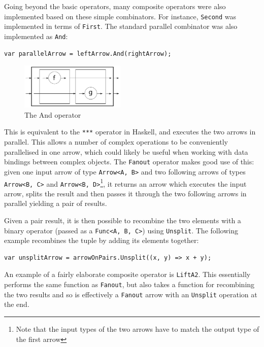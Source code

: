 \documentclass[12pt,twoside,notitlepage]{report}
\begin{document}
Going beyond the basic operators, many composite operators were also implemented based on these simple combinators. For instance, \texttt{Second} was implemented in terms of \texttt{First}. The standard parallel combinator was also implemented as \texttt{And}:

\begin{lstlisting}[language={[Sharp]C}]
var parallelArrow = leftArrow.And(rightArrow);
\end{lstlisting}

\begin{figure}[!ht]
  \centering
  \includegraphics[width=50mm]{fig/AndOperator.pdf}
  \caption{The And operator}
  \label{fig:and_operator}
\end{figure}

This is equivalent to the \texttt{***} operator in Haskell, and executes the two arrows in parallel. This allows a number of complex operations to be conveniently parallelised in one arrow, which could likely be useful when working with data bindings between complex objects. The \texttt{Fanout} operator makes good use of this: given one input arrow of type \texttt{Arrow<A, B>} and two following arrows of types \texttt{Arrow<B, C>} and \texttt{Arrow<B, D>}\footnote{Note that the input types of the two arrows have to match the output type of the first arrow}, it returns an arrow which executes the input arrow, splits the result and then passes it through the two following arrows in parallel yielding a pair of results.

Given a pair result, it is then possible to recombine the two elements with a binary operator (passed as a \texttt{Func<A, B, C>}) using \texttt{Unsplit}. The following example recombines the tuple by adding its elements together:

\begin{lstlisting}[language={[Sharp]C}]
var unsplitArrow = arrowOnPairs.Unsplit((x, y) => x + y);
\end{lstlisting}

An example of a fairly elaborate composite operator is \texttt{LiftA2}. This essentially performs the same function as \texttt{Fanout}, but also takes a function for recombining the two results and so is effectively a \texttt{Fanout} arrow with an \texttt{Unsplit} operation at the end.
\end{document}
